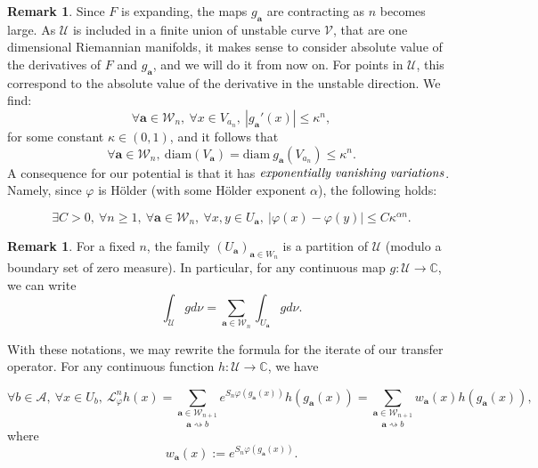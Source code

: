 \documentclass[a4paper]{article}
\theoremstyle{definition}
\newtheorem{remark}[example]{Remark}
\begin{document}
\begin{remark}

Since $F$ is expanding, the maps $g_{\mathbf{a}}$ are contracting as $n$ becomes large. As $\mathcal{U}$ is included in a finite union of unstable curve $\mathcal{V}$, that are one dimensional Riemannian manifolds, it makes sense to consider absolute value of the derivatives of $F$ and $g_{\mathbf{a}}$, and we will do it from now on. For points in $\mathcal{U}$, this correspond to the absolute value of the derivative in the unstable direction. We find:
$$ \forall \mathbf{a} \in \mathcal{W}_n, \ \forall x \in V_{a_n}, \ |g_{\mathbf{a}}'(x)| \leq \kappa^n  , $$
for some constant $\kappa \in (0,1)$, and it follows that
$$\forall \mathbf{a} \in \mathcal{W}_n,  \ \text{diam}(V_{\textbf{a}}) = \text{diam} \ g_{\mathbf{a}}\left( V_{a_n} \right) \leq \kappa^n .$$
A consequence for our potential is that it has $\emph{exponentially vanishing variations}$. Namely, since $\varphi$ is Hölder (with some Hölder exponent $\alpha$), the following holds:

$$ \exists C>0, \ \forall n \geq 1, \ \forall \mathbf{a} \in \mathcal{W}_n, \ \forall x,y \in U_{\mathbf{a}}, \ |\varphi(x) - \varphi(y)| \leq C \kappa^{\alpha n} .$$


\end{remark}


\begin{remark}

For a fixed $n$, the family $(U_{\mathbf{a}})_{\mathbf{a} \in W_n}$ is a partition of $\mathcal{U}$ (modulo a boundary set of zero measure). In particular, for any continuous map $g:\mathcal{U} \rightarrow \mathbb{C}$, we can write
$$ \int_{\mathcal{U}} g d \nu = \sum_{\mathbf{a} \in \mathcal{W}_n} \int_{U_{\mathbf{a}}} g d\nu.$$

\end{remark}



With these notations, we may rewrite the formula for the iterate of our transfer operator. For any continuous function $h : \mathcal{U} \longrightarrow \mathbb{C} $, we have

$$\forall b \in \mathcal{A}, \ \forall x \in U_b, \ \mathcal{L}_\varphi^n h(x) = \underset{\mathbf{a} \rightsquigarrow b}{\sum_{\mathbf{a} \in \mathcal{W}_{n+1}}} e^{S_n \varphi(g_{\mathbf{a}}(x))} h(g_{\mathbf{a}}(x)) = \underset{\mathbf{a} \rightsquigarrow b}{\sum_{\mathbf{a} \in \mathcal{W}_{n+1}}} w_{\mathbf{a}}(x) h(g_{\mathbf{a}}(x)),$$
where $$ w_{\mathbf{a}}(x) := e^{S_n\varphi(g_{\mathbf{a}}(x))} .$$
\end{document}

